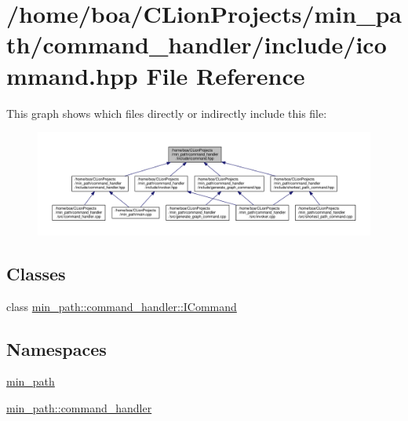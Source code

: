 \hypertarget{a00021}{}\section{/home/boa/\+C\+Lion\+Projects/min\+\_\+path/command\+\_\+handler/include/icommand.hpp File Reference}
\label{a00021}
This graph shows which files directly or indirectly include this file\+:
\nopagebreak
\begin{figure}[H]
\begin{center}
\leavevmode
\includegraphics[width=350pt]{d5/de0/a00050}
\end{center}
\end{figure}
\subsection*{Classes}
\begin{DoxyCompactItemize}
\item 
class \hyperlink{a00008}{min\+\_\+path\+::command\+\_\+handler\+::\+I\+Command}
\end{DoxyCompactItemize}
\subsection*{Namespaces}
\begin{DoxyCompactItemize}
\item 
 \hyperlink{a00033}{min\+\_\+path}
\item 
 \hyperlink{a00035}{min\+\_\+path\+::command\+\_\+handler}
\end{DoxyCompactItemize}
